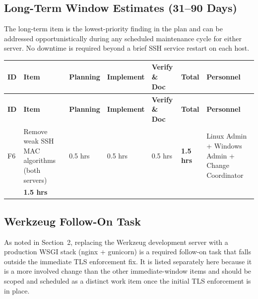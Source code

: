 \documentclass[12pt]{article}
\begin{document}
\subsection{Long-Term Window Estimates (31--90 Days)}
 
The long-term item is the lowest-priority finding in the plan and can be
addressed opportunistically during any scheduled maintenance cycle for
either server. No downtime is required beyond a brief SSH service restart
on each host.
 
\bigskip
 
\noindent
\begin{longtable}{>{\bfseries}p{1.0cm} p{2.8cm} p{1.4cm} p{1.4cm} p{1.6cm} p{1.4cm} p{2.0cm}}
  \rowcolor{headercol}
  \color{white}\textbf{ID} &
  \color{white}\textbf{Item} &
  \color{white}\textbf{Planning} &
  \color{white}\textbf{Implement} &
  \color{white}\textbf{Verify \& Doc} &
  \color{white}\textbf{Total} &
  \color{white}\textbf{Personnel} \\
  \endfirsthead
  \rowcolor{headercol}
  \color{white}\textbf{ID} &
  \color{white}\textbf{Item} &
  \color{white}\textbf{Planning} &
  \color{white}\textbf{Implement} &
  \color{white}\textbf{Verify \& Doc} &
  \color{white}\textbf{Total} &
  \color{white}\textbf{Personnel} \\
  \endhead
  \midrule
 
  F6 &
  Remove weak SSH MAC algorithms (both servers) &
  0.5 hrs &
  0.5 hrs &
  0.5 hrs &
  \textbf{1.5 hrs} &
  Linux Admin + Windows Admin + Change Coordinator \\[4pt]
 
  \rowcolor{totalrowcol}
  \multicolumn{5}{l}{\textbf{Long-term window total}} &
  \textbf{1.5 hrs} &
  \\[2pt]
 
  \bottomrule
\end{longtable}
 
\subsection{Werkzeug Follow-On Task}
 
As noted in Section~2, replacing the Werkzeug development server with a
production WSGI stack (nginx + gunicorn) is a required follow-on task that
falls outside the immediate TLS enforcement fix. It is listed separately
here because it is a more involved change than the other immediate-window
items and should be scoped and scheduled as a distinct work item once the
initial TLS enforcement is in place.
 
\end{document}
